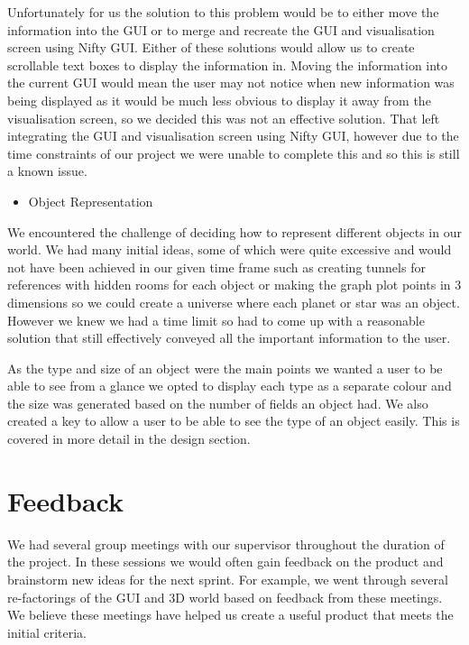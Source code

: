 \documentclass[11pt, a4paper]{report}
\begin{document}
Unfortunately for us the solution to this problem would be to either move the information into the GUI or to merge and recreate the GUI and visualisation screen using Nifty GUI. Either of these solutions would allow us to create scrollable text boxes to display the information in. Moving the information into the current GUI would mean the user may not notice when new information was being displayed as it would be much less obvious to display it away from the visualisation screen, so we decided this was not an effective solution. That left integrating the GUI and visualisation screen using Nifty GUI, however due to the time constraints of our project we were unable to complete this and so this is still a known issue.

\begin{itemize}
  \item Object Representation
\end{itemize}

We encountered the challenge of deciding how to represent different objects in our world. We had many initial ideas, some of which were quite excessive and would not have been achieved in our given time frame such as creating tunnels for references with hidden rooms for each object or making the graph plot points in 3 dimensions so we could create a universe where each planet or star was an object. However we knew we had a time limit so had to come up with a reasonable solution that still effectively conveyed all the important information to the user.

As the type and size of an object were the main points we wanted a user to be able to see from a glance we opted to display each type as a separate colour and the size was generated based on the number of fields an object had. We also created a key to allow a user to be able to see the type of an object easily. This is covered in more detail in the design section. 

\section{Feedback}

We had several group meetings with our supervisor throughout the duration of the project. In these sessions we would often gain feedback on the product and brainstorm new ideas for the next sprint. For example, we went through several re-factorings of the GUI and 3D world based on feedback from these meetings. We believe these meetings have helped us create a useful product that meets the initial criteria.
\end{document}
